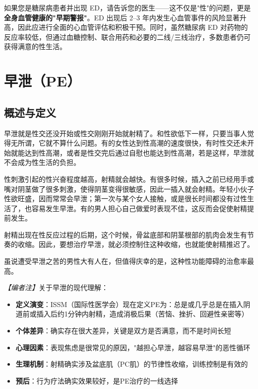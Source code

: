 \begin{tcolorbox}[colback=pink!5!white,colframe=red!50!black,title=贴心小叮咛]
如果您是糖尿病患者并出现 ED，请告诉您的医生——这不仅是"性"的问题，更是\textbf{全身血管健康的"早期警报"}。ED 出现后 2--3 年内发生心血管事件的风险显著升高，因此应进行全面的心血管评估和积极干预。同时，虽然糖尿病 ED 对药物的反应率较低，但通过血糖控制、联合用药和必要的二线/三线治疗，多数患者仍可获得满意的性生活。
\end{tcolorbox}

\section{早泄（PE）}
\subsection{概述与定义}

早泄就是性交还没开始或性交刚刚开始就射精了。和性欲低下一样，只要当事人觉得无所谓，它就不算什么问题。有的女性达到性高潮的速度很快，有时性交还未开始就能达到性高潮，或者是性交完后通过自慰也能达到性高潮，若是这样，早泄就不会成为性生活的负担。

性刺激引起的性兴奋程度越高，射精就会越快。有很多时候，插入之前已经用手或嘴对阴茎做了很多刺激，使得阴茎变得很敏感，因此一插入就会射精。年轻小伙子性欲旺盛，因而常常会早泄；第一次与某个女人接触，或是很长时间都没有过性生活了，也容易发生早泄。有的男人担心自己做爱时表现不佳，这反而会促使射精提前发生。

射精出现在性反应过程的后期，这个时候，骨盆底部和阴茎根部的肌肉会发生有节奏的收缩。因此，要想治疗早泄，就必须控制住这种收缩，也就能使射精推迟了。

虽说遭受早泄之苦的男性大有人在，但值得庆幸的是，这种性功能障碍的治愈率最高。

\noindent\textit{【编者注】}关于早泄的现代理解：
\begin{itemize}
	\item \textbf{定义演变}：ISSM（国际性医学会）现在定义PE为：总是或几乎总是在插入阴道前或插入后约1分钟内射精，造成消极后果（苦恼、挫折、回避性亲密等）
	\item \textbf{个体差异}：确实存在很大差异，关键是双方是否满意，而不是时间长短
	\item \textbf{心理因素}：表现焦虑是很常见的原因，"越担心早泄，越容易早泄"的恶性循环
	\item \textbf{生理机制}：射精确实涉及盆底肌（PC肌）的节律性收缩，训练控制是有效的
	\item \textbf{预后}：行为疗法确实效果较好，是PE治疗的一线选择
\end{itemize}

